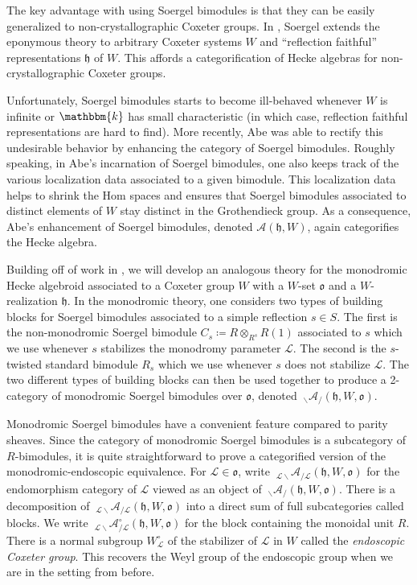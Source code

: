 \documentclass{amsart}
\renewcommand{\k}{\mathbbm{k}}
\newcommand{\scrA}{\mathcal{A}}
\newcommand{\scrL}{\mathcal{L}}
\newcommand{\fr}[1]{\mathfrak{#1}}
\newcommand{\Amon}[2]{\:_{#1 \backslash} \mathcal{A}_{/ #2} }
\theoremstyle{definition}
\numberwithin{equation}{subsection}
\begin{document}
The key advantage with using Soergel bimodules is that they can be easily generalized to non-crystallographic Coxeter groups.
In \cite{So07}, Soergel extends the eponymous theory to arbitrary Coxeter systems $W$ and ``reflection faithful'' representations $\fr{h}$ of $W$.
This affords a categorification of Hecke algebras for non-crystallographic Coxeter groups.

Unfortunately, Soergel bimodules starts to become ill-behaved whenever $W$ is infinite or $\k$ has small characteristic (in which case, reflection faithful representations are hard to find).
More recently, Abe \cite{Abe19} was able to rectify this undesirable behavior by enhancing the category of Soergel bimodules.
Roughly speaking, in Abe's incarnation of Soergel bimodules, one also keeps track of the various localization data associated to a given bimodule.
This localization data helps to shrink the Hom spaces and ensures that Soergel bimodules associated to distinct elements of $W$ stay distinct in the Grothendieck group.
As a consequence, Abe's enhancement of Soergel bimodules, denoted $\scrA (\fr{h}, W)$, again categorifies the Hecke algebra.

Building off of work in \cite{LY}, we will develop an analogous theory for the monodromic Hecke algebroid associated to a Coxeter group $W$ with a $W$-set $\fr{o}$ and a $W$-realization $\fr{h}$.
In the monodromic theory, one considers two types of building blocks for Soergel bimodules associated to a simple reflection $s \in S$.
The first is the non-monodromic Soergel bimodule $C_s \coloneq R \otimes_{R^s} R (1)$ associated to $s$ which we use whenever $s$ stabilizes the monodromy parameter $\scrL$.
The second is the $s$-twisted standard bimodule $R_s$ which we use whenever $s$ does not stabilize $\scrL$.
The two different types of building blocks can then be used together to produce a 2-category of monodromic Soergel bimodules over $\fr{o}$, denoted $\Amon{}{} (\fr{h}, W, \fr{o})$.

Monodromic Soergel bimodules have a convenient feature compared to parity sheaves. 
Since the category of monodromic Soergel bimodules is a subcategory of $R$-bimodules, it is quite straightforward to prove a categorified version of the monodromic-endoscopic equivalence.
For $\scrL \in \fr{o}$, write $\Amon{\scrL}{\scrL} (\fr{h}, W, \fr{o})$ for the endomorphism category of $\scrL$ viewed as an object of $\Amon{}{} (\fr{h}, W, \fr{o})$.
There is a decomposition of $\Amon{\scrL}{\scrL} (\fr{h}, W, \fr{o})$ into a direct sum of full subcategories called blocks. We write $\Amon{\scrL}{\scrL}^{\circ} (\fr{h}, W, \fr{o})$ for the block containing the monoidal unit $R$. 
There is a normal subgroup $W_{\scrL}^{\circ}$ of the stabilizer of $\scrL$ in $W$ called the \emph{endoscopic Coxeter group}. This recovers the Weyl group of the endoscopic group when we are in the setting from before.
\end{document}
